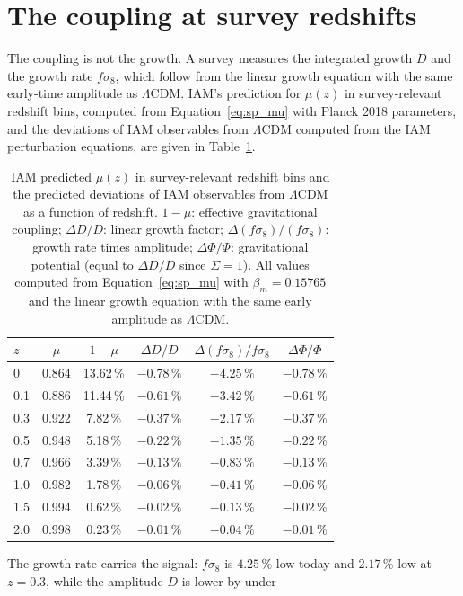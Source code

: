\section{The coupling at survey redshifts}\label{sec:sp_table}
The coupling is not the growth. A survey measures the integrated growth $D$ and the growth rate $f\sigma_8$, which follow from the linear growth
equation with the same early-time amplitude as $\Lambda$CDM. IAM's prediction for $\mu(z)$ in survey-relevant redshift bins, computed from
Equation~\eqref{eq:sp_mu} with Planck 2018 parameters, and the deviations of IAM observables from $\Lambda$CDM computed from the IAM perturbation
equations, are given in Table~\ref{tab:sp_deviations}. \calc
\begin{table}[htbp]\centering\small
\caption{IAM predicted $\mu(z)$ in survey-relevant redshift bins and the predicted deviations of IAM observables from $\Lambda$CDM as a function
of redshift. $1-\mu$: effective gravitational coupling; $\Delta D/D$: linear growth factor; $\Delta(f\sigma_8)/(f\sigma_8)$: growth rate times
amplitude; $\Delta\Phi/\Phi$: gravitational potential (equal to $\Delta D/D$ since $\Sigma=1$). All values computed from Equation~\eqref{eq:sp_mu}
with $\beta_m=0.15765$ and the linear growth equation with the same early amplitude as $\Lambda$CDM. \calc}\label{tab:sp_deviations}
\begin{tabular}{lccccc}\toprule
$z$ & $\mu$ & $1-\mu$ & $\Delta D/D$ & $\Delta(f\sigma_8)/f\sigma_8$ & $\Delta\Phi/\Phi$\\\midrule
0   & 0.864 & 13.62\,\% & $-0.78\,\%$ & $-4.25\,\%$ & $-0.78\,\%$\\
0.1 & 0.886 & 11.44\,\% & $-0.61\,\%$ & $-3.42\,\%$ & $-0.61\,\%$\\
0.3 & 0.922 & 7.82\,\%  & $-0.37\,\%$ & $-2.17\,\%$ & $-0.37\,\%$\\
0.5 & 0.948 & 5.18\,\%  & $-0.22\,\%$ & $-1.35\,\%$ & $-0.22\,\%$\\
0.7 & 0.966 & 3.39\,\%  & $-0.13\,\%$ & $-0.83\,\%$ & $-0.13\,\%$\\
1.0 & 0.982 & 1.78\,\%  & $-0.06\,\%$ & $-0.41\,\%$ & $-0.06\,\%$\\
1.5 & 0.994 & 0.62\,\%  & $-0.02\,\%$ & $-0.13\,\%$ & $-0.02\,\%$\\
2.0 & 0.998 & 0.23\,\%  & $-0.01\,\%$ & $-0.04\,\%$ & $-0.01\,\%$\\\bottomrule
\end{tabular}\end{table}
The growth rate carries the signal: $f\sigma_8$ is $4.25\,\%$ low today and $2.17\,\%$ low at $z=0.3$, while the amplitude $D$ is lower by under
